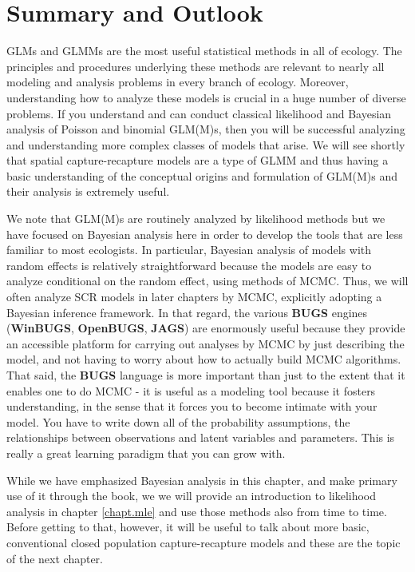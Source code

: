 \section{ Summary and Outlook}

GLMs and GLMMs are the most useful statistical methods in all of
ecology. The principles and procedures underlying these methods are
relevant to nearly all modeling and analysis problems in every branch
of ecology. Moreover, understanding how to analyze these models is
crucial in a huge number of diverse problems. If you understand and
can conduct classical likelihood and Bayesian analysis of Poisson and
binomial GLM(M)s, then you will be successful analyzing and
understanding more complex classes of models that arise. We will see
shortly that spatial capture-recapture models are a type of GLMM
and thus having a basic
understanding of the conceptual origins and formulation of GLM(M)s and
their analysis is extremely useful.

We note that GLM(M)s are routinely
analyzed by likelihood methods but we have focused on Bayesian
analysis here in order to develop the tools that are less familiar to
most ecologists.  In particular, Bayesian analysis of models with random
effects is relatively straightforward because the models
are easy to analyze conditional on the random effect, using methods of
MCMC.  Thus, we will often analyze SCR models in later chapters by
MCMC, explicitly adopting a Bayesian inference framework.
In that regard, the various {\bf BUGS} engines ({\bf WinBUGS}, {\bf
  OpenBUGS}, {\bf JAGS}) are enormously useful because they
provide an accessible platform for
carrying out  analyses by MCMC by just
describing the model, and not having to worry about how to actually
build MCMC algorithms.  That said, the {\bf BUGS} language is more important
than just to the extent that it enables one to do MCMC - it is useful
as a modeling tool because it fosters understanding, in the sense that
it forces you to become intimate with your model. You have to write
down all of the probability assumptions, the relationships between
observations and latent variables and parameters. This is really a
great learning paradigm that you can grow with.

While we have emphasized Bayesian analysis in this chapter, and make
primary use of it through the book, we
we will provide an introduction to likelihood analysis in chapter
\ref{chapt.mle} and use those  methods also from time to time.
 Before getting to that, however, it will be useful to
talk about more basic, conventional closed population
capture-recapture models and these are the topic of the next chapter.
